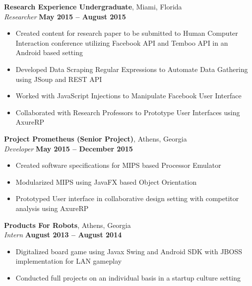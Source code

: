 \documentclass[margin,line]{resume}
\begin{document}
\begin{resume}
\begin{list2}
	
	\textbf{Research Experience Undergraduate}, Miami, Florida \vspace{1mm}\\\vspace{1mm}%
	\textsl{Researcher} \hfill \textbf{May 2015 -- August 2015}
	\begin{itemize}
		\item Created content for research paper to be submitted to Human Computer Interaction conference utilizing Facebook API and Temboo API in an Android based setting
		\item Developed Data Scraping Regular Expressions to Automate Data Gathering using JSoup and REST API
		\item Worked with JavaScript Injections to Manipulate Facebook User Interface
		\item Collaborated with  Research Professors to Prototype User Interfaces using AxureRP
	\end{itemize}
	
	\textbf{Project Prometheus (Senior Project)}, Athens, Georgia \vspace{1mm}\\\vspace{1mm}%
	\textsl{Developer} \hfill \textbf{May 2015 -- December 2015}
		\begin{itemize}
		\item Created software specifications for MIPS based Processor Emulator
		\item Modularized MIPS using JavaFX based Object Orientation
		\item Prototyped User interface in collaborative design setting with competitor analysis using AxureRP 
	\end{itemize}

	
	\textbf{Products For Robots}, Athens, Georgia \vspace{1mm}\\\vspace{1mm}%
	\textsl{Intern} \hfill \textbf{August 2013 -- August 2014}
	\begin{itemize}
		\item Digitalized board game using Javax Swing and Android SDK with JBOSS implementation for LAN gameplay
		\item Conducted full projects on an individual basis in a startup culture setting
	\end{itemize}
	
	
	\end{list2}\vspace{-1.5mm}

\end{resume}
\end{document}
